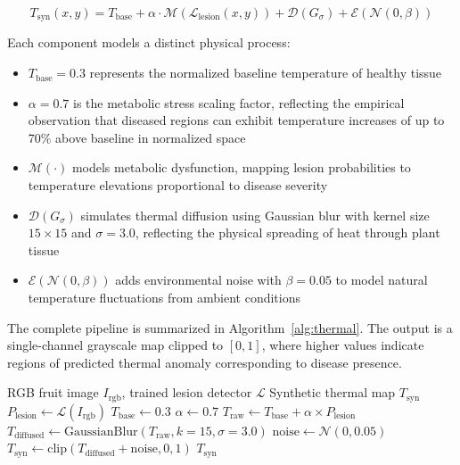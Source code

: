 \documentclass[utf8]{FrontiersinHarvard}
\newenvironment{revblock}{}{}
\begin{document}
\begin{equation}
    T_{\text{syn}}(x,y) = T_{\text{base}} + \alpha \cdot \mathcal{M}(\mathcal{L}_{\text{lesion}}(x,y)) + \mathcal{D}(G_{\sigma}) + \mathcal{E}(\mathcal{N}(0,\beta))
    \label{eq:thermal_synthesis}
\end{equation}

\begin{revblock}
Each component models a distinct physical process:
\begin{itemize}
    \item $T_{\text{base}} = 0.3$ represents the normalized baseline temperature of healthy tissue
    \item $\alpha = 0.7$ is the metabolic stress scaling factor, reflecting the empirical observation that diseased regions can exhibit temperature increases of up to 70\% above baseline in normalized space \cite{mahlein2016}
    \item $\mathcal{M}(\cdot)$ models metabolic dysfunction, mapping lesion probabilities to temperature elevations proportional to disease severity
    \item $\mathcal{D}(G_{\sigma})$ simulates thermal diffusion using Gaussian blur with kernel size $15 \times 15$ and $\sigma = 3.0$, reflecting the physical spreading of heat through plant tissue
    \item $\mathcal{E}(\mathcal{N}(0,\beta))$ adds environmental noise with $\beta = 0.05$ to model natural temperature fluctuations from ambient conditions
\end{itemize}

The complete pipeline is summarized in Algorithm~\ref{alg:thermal}. The output is a single-channel grayscale map clipped to $[0, 1]$, where higher values indicate regions of predicted thermal anomaly corresponding to disease presence.
\end{revblock}

\begin{algorithm}[H]
    \caption{Thermal Synthesis Pipeline}
    \label{alg:thermal}
    \begin{algorithmic}[1]
        \REQUIRE RGB fruit image $I_{\text{rgb}}$, trained lesion detector $\mathcal{L}$
        \ENSURE Synthetic thermal map $T_{\text{syn}}$
        \STATE $P_{\text{lesion}} \leftarrow \mathcal{L}(I_{\text{rgb}})$
        \STATE $T_{\text{base}} \leftarrow 0.3$
        \STATE $\alpha \leftarrow 0.7$
        \STATE $T_{\text{raw}} \leftarrow T_{\text{base}} + \alpha \times P_{\text{lesion}}$
        \STATE $T_{\text{diffused}} \leftarrow \text{GaussianBlur}(T_{\text{raw}}, k{=}15, \sigma{=}3.0)$
        \STATE $\text{noise} \leftarrow \mathcal{N}(0, 0.05)$
        \STATE $T_{\text{syn}} \leftarrow \text{clip}(T_{\text{diffused}} + \text{noise}, 0, 1)$
        \RETURN $T_{\text{syn}}$
    \end{algorithmic}
\end{algorithm}
\end{document}
